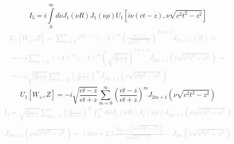 \begin{equation}
I_5 = i \int \limits_{0}^{\infty} d \nu J_1 \left( \nu R \right) 
J_1 \left( \nu \rho \right)
U_1 \left[ i \nu \left( ct - z \right), \nu \sqrt{c^2t^2 - z^2} \right]
\end{equation}
%
\textcolor{lightgray}{ \begin{equation*} \begin{aligned}
U_1[W_+, Z] = \sum \limits_{m = 0}^{\infty} i^{2m+1} (-1)^m 
\left( \frac{ct-z}{\sqrt{c^2t^2-z^2}} \right)^{2m + 1} J_{2m + 1} (Z) = \\
= - i \sum \limits_{m = 0}^{\infty} (-1)^m  (-1)^m 
\left( \sqrt{\frac{ct-z}{ct+z}} \right)^{2m + 1}
J_{2m + 1} \left( \nu \sqrt{c^2t^2-z^2} \right) = \\
= - i \sqrt{\frac{ct-z}{ct+z}} \sum \limits_{m = 0}^{\infty}
\left( \frac{ct-z}{ct+z} \right)^m 
J_{2m + 1} \left( \nu \sqrt{c^2t^2-z^2} \right)
\end{aligned} \end{equation*} }
%
\begin{equation} 
U_1[W_+, Z] = - i \sqrt{\frac{ct-z}{ct+z}} \sum \limits_{m = 0}^{\infty}
\left( \frac{ct-z}{ct+z} \right)^m J_{2m + 1} \left(  \nu \sqrt{c^2t^2-z^2} \right)
\end{equation}
%
\textcolor{lightgray}{ \begin{equation*} \begin{aligned}
I_5 = \sqrt{\frac{ct-z}{ct+z}} \sum_{m = 0}^{\infty} 
\left( \frac{ct-z}{ct+z} \right)^m \int_{0}^{\infty} d \nu J_1(\nu R) 
J_1 (\nu \rho) J_{2m + 1} \left(  \nu \sqrt{c^2t^2-z^2} \right)
\end{aligned} \end{equation*} }
%
\textcolor{lightgray}{ \begin{equation*} \begin{aligned}
J_{2m + 2} \left( \nu \sqrt{c^2t^2-z^2} \right) = (4m+2) 
\frac{J_{2m+1} \left( \nu \sqrt{c^2t^2-z^2} \right)}{\nu \sqrt{c^2t^2-z^2}} -
J_{2m} \left( \nu \sqrt{c^2t^2-z^2} \right)
\end{aligned} \end{equation*} }